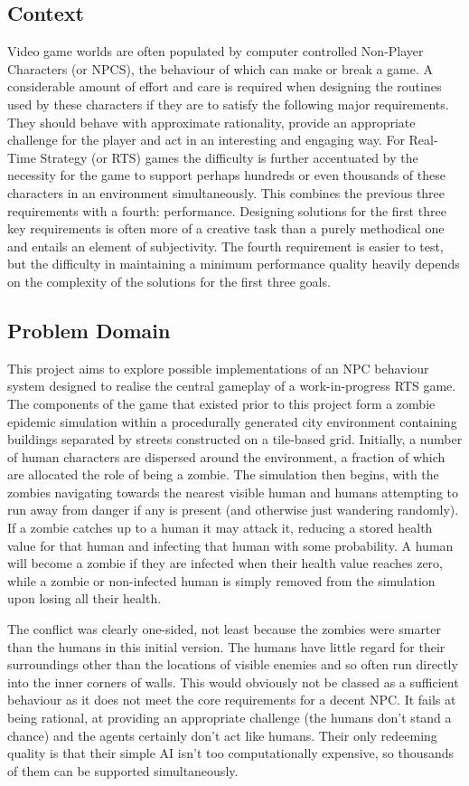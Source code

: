 \documentclass[a4paper,12pt]{article}
\begin{document}
\subsection{Context}\noindent
Video game worlds are often populated by computer controlled Non-Player Characters (or NPCS), the behaviour of which can make or break a game. A considerable amount of effort and care is required when designing the routines used by these characters if they are to satisfy the following major requirements. They should behave with approximate rationality, provide an appropriate challenge for the player and act in an interesting and engaging way. For Real-Time Strategy (or RTS) games the difficulty is further accentuated by the necessity for the game to support perhaps hundreds or even thousands of these characters in an environment simultaneously. This combines the previous three requirements with a fourth: performance. Designing solutions for the first three key requirements is often more of a creative task than a purely methodical one and entails an element of subjectivity. The fourth requirement is easier to test, but the difficulty in maintaining a minimum performance quality heavily depends on the complexity of the solutions for the first three goals.

\subsection{Problem Domain}\noindent
This project aims to explore possible implementations of an NPC behaviour system designed to realise the central gameplay of a work-in-progress RTS game. The components of the game that existed prior to this project form a zombie epidemic simulation within a procedurally generated city environment containing buildings separated by streets constructed on a tile-based grid. Initially, a number of human characters are dispersed around the environment, a fraction of which are allocated the role of being a zombie. The simulation then begins, with the zombies navigating towards the nearest visible human and humans attempting to run away from danger if any is present (and otherwise just wandering randomly). If a zombie catches up to a human it may attack it, reducing a stored health value for that human and infecting that human with some probability. A human will become a zombie if they are infected when their health value reaches zero, while a zombie or non-infected human is simply removed from the simulation upon losing all their health.

The conflict was clearly one-sided, not least because the zombies were smarter than the humans in this initial version. The humans have little regard for their surroundings other than the locations of visible enemies and so often run directly into the inner corners of walls. This would obviously not be classed as a sufficient behaviour as it does not meet the core requirements for a decent NPC. It fails at being rational, at providing an appropriate challenge (the humans don't stand a chance) and the agents certainly don't act like humans. Their only redeeming quality is that their simple AI isn't too computationally expensive, so thousands of them can be supported simultaneously.
\end{document}

